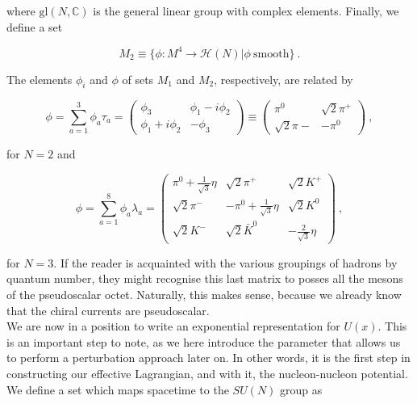\documentclass[10pt,twoside]{report}
\begin{document}
	\noindent where $\text{gl}(N,\mathbb{C})$ is the general linear group with complex elements. Finally, we define a set
	
	\begin{equation}
		M_2 \equiv \{ \phi:M^4 \rightarrow\mathcal{H}(N)|\phi\:\text{smooth} \} \:.
	\end{equation} 
	
	The elements $\phi_i$ and $\phi$ of sets $M_1$ and $M_2$, respectively, are related by
	
	\begin{equation}
		\phi = \sum_{a=1}^3 \phi_a\tau_a = \begin{pmatrix}
		\phi_3 & \phi_1-i\phi_2 \\ 
		\phi_1+i\phi_2 & -\phi_3
		\end{pmatrix} \equiv 
		\begin{pmatrix}
		\pi^0 & \sqrt{2}\pi^+ \\
		\sqrt{2}\pi- & -\pi^0
		\end{pmatrix} \:,
	\end{equation}
	
	\noindent for $N=2$ and
	
	\begin{equation}
	\phi = \sum_{a=1}^8 \phi_a\lambda_a = \begin{pmatrix}
	 \pi^0+\frac{1}{\sqrt{3}}\eta & \sqrt{2}\pi^+ & \sqrt{2}K^+ \\
	 \sqrt{2}\pi^- & -\pi^0 + \frac{1}{\sqrt{3}}\eta & \sqrt{2}K^0 \\
	 \sqrt{2}K^- & \sqrt{2}\bar{K}^0 & -\frac{2}{\sqrt{3}}\eta 
	\end{pmatrix} \:,
	\end{equation}
	
	\noindent for $N=3$. If the reader is acquainted with the various groupings of hadrons by quantum number, they might recognise this last matrix to posses all the mesons of the pseudoscalar octet. Naturally, this makes sense, because we already know that the chiral currents are pseudoscalar.\\
	
	
	
	We are now in a position to write an exponential representation for $U(x)$. This is an important step to note, as we here introduce the parameter that allows us to perform a perturbation approach later on. In other words, it is the first step in constructing our effective Lagrangian, and with it, the nucleon-nucleon potential. We define a set which maps spacetime to the $SU(N)$ group as
	
\end{document}
